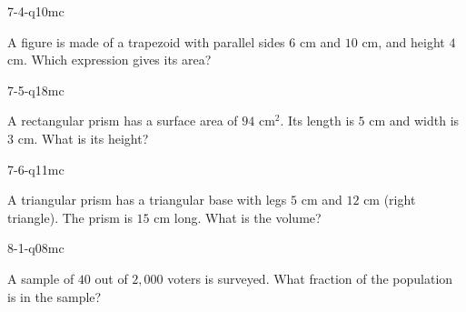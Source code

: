 \begin{practiceQuestion}{7-4-q10}{mc}
\begin{questionText}
A figure is made of a trapezoid with parallel sides $6$ cm and $10$ cm, and height $4$ cm. Which expression gives its area?
\end{questionText}
\end{practiceQuestion}

\begin{practiceQuestion}{7-5-q18}{mc}
\begin{questionText}
A rectangular prism has a surface area of $94$ cm$^2$. Its length is $5$ cm and width is $3$ cm. What is its height?
\end{questionText}
\end{practiceQuestion}

\begin{practiceQuestion}{7-6-q11}{mc}
\begin{questionText}
A triangular prism has a triangular base with legs $5$ cm and $12$ cm (right triangle). The prism is $15$ cm long. What is the volume?
\end{questionText}
\end{practiceQuestion}

\begin{practiceQuestion}{8-1-q08}{mc}
\begin{questionText}
A sample of $40$ out of $2{,}000$ voters is surveyed. What fraction of the population is in the sample?
\end{questionText}
\end{practiceQuestion}

